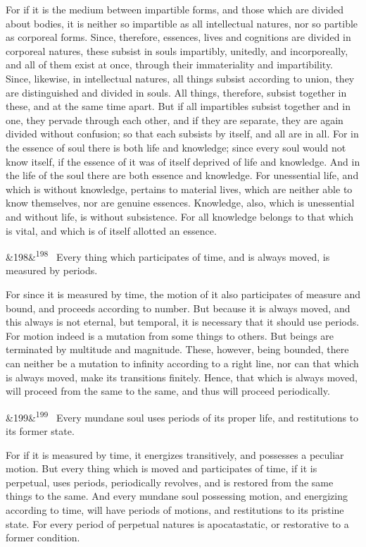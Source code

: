 \documentclass[12pt]{article}
\newcommand{\para}[1][]{\par\noindent\ifx&#1&\else\textsuperscript{\footnotesize #1}~\fi}
\begin{document}
For if it is the medium between impartible forms, and those which are divided about bodies, it is neither so impartible as all intellectual natures, nor so partible as corporeal forms. Since, therefore, essences, lives and cognitions are divided in corporeal natures, these subsist in souls impartibly, unitedly, and incorporeally, and all of them exist at once, through their immateriality and impartibility. Since, likewise, in intellectual natures, all things subsist according to union, they are distinguished and divided in souls. All things, therefore, subsist together in these, and at the same time apart. But if all impartibles subsist together and in one, they pervade through each other, and if they are separate, they are again divided without confusion; so that each subsists by itself, and all are in all. For in the essence of soul there is both life and knowledge; since every soul would not know itself, if the essence of it was of itself deprived of life and knowledge. And in the life of the soul there are both essence and knowledge. For unessential life, and which is without knowledge, pertains to material lives, which are neither able to know themselves, nor are genuine essences. Knowledge, also, which is unessential and without life, is without subsistence. For all knowledge belongs to that which is vital, and which is of itself allotted an essence.

\para[198] Every thing which participates of time, and is always moved, is measured by periods.

For since it is measured by time, the motion of it also participates of measure and bound, and proceeds according to number. But because it is always moved, and this always is not eternal, but temporal, it is necessary that it should use periods. For motion indeed is a mutation from some things to others. But beings are terminated by multitude and magnitude. These, however, being bounded, there can neither be a mutation to infinity according to a right line, nor can that which is always moved, make its transitions finitely. Hence, that which is always moved, will proceed from the same to the same, and thus will proceed periodically.

\para[199] Every mundane soul uses periods of its proper life, and restitutions to its former state.

For if it is measured by time, it energizes transitively, and possesses a peculiar motion. But every thing which is moved and participates of time, if it is perpetual, uses periods, periodically revolves, and is restored from the same things to the same. And every mundane soul possessing motion, and energizing according to time, will have periods of motions, and restitutions to its pristine state. For every period of perpetual natures is apocatastatic, or restorative to a former condition.
\end{document}
